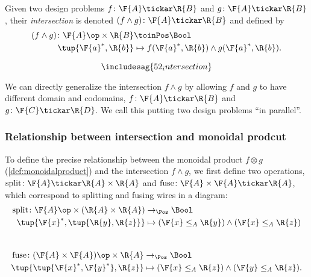 \begin{definition}
Given two design problems $f\colon \F{A} \tickar \R{B}$ and $g\colon \F{A} \tickar \R{B}$,
their \emph{intersection} is denoted $(f \wedge g)\colon \F{A} \tickar \R{B}$ and defined by
\begin{equation}
	\begin{aligned}
		(f \wedge g)\colon \F{A}\op \times \R{B} & \toinPos \Bool \\
		\tup{\F{a}^*, \R{b}} & \mapsto f(\F{a}^*, \R{b}) \wedge  g(\F{a}^*, \R{b}).
	\end{aligned}
\end{equation}

\begin{equation}
    \includesag{52_intersection}
\end{equation}
\end{definition}

We can directly generalize the intersection $f \wedge g$ by allowing $f$ and $g$ to have different domain and codomains, $f \colon \F{A} \tickar \R{B}$ and $g \colon \F{C} \tickar \R{D}$. We call this putting two design problems ``in parallel''.
\subsubsection{Relationship between intersection and monoidal prodcut}
To define the precise relationship between the monoidal product $f \otimes g$ (\cref{def:monoidalproduct}) and the intersection $f \wedge g$, we first define two operations, $\text{split} \colon \F{A} \tickar \R{A} \times \R{A}$ and $\text{fuse} \colon \F{A} \times \F{A} \tickar \R{A}$, which correspond to splitting and fusing wires in a diagram:
\begin{equation}
\begin{aligned}
    \text{split} \colon \F{A}\op \times (\R{A} \times \R{A}) &\to_\Pos \Bool \\
    \tup{\F{x}^*, \tup{\R{y}, \R{z}}} &\mapsto (\F{x} \leq_A \R{y}) \wedge (\F{x} \leq_A \R{z})
\end{aligned}
\end{equation}
~
\begin{equation}
\begin{aligned}
    \text{fuse} \colon (\F{A} \times \F{A})\op \times \R{A} &\to_\Pos \Bool \\
    \tup{ \tup{\F{x}^*, \F{y}^*}, \R{z}} &\mapsto (\F{x} \leq_A \R{z}) \wedge (\F{y} \leq_A \R{z}).
\end{aligned}
\end{equation}

